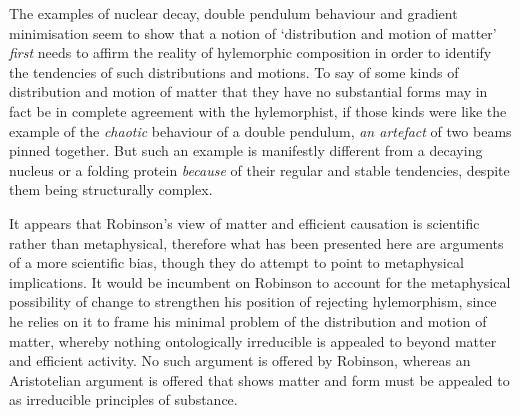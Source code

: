 The examples of nuclear decay, double pendulum behaviour and gradient minimisation seem to show that a notion of `distribution and motion of matter' \emph{first} needs to affirm the reality of hylemorphic composition in order to identify the tendencies of such distributions and motions. To say of some kinds of distribution and motion of matter that they have no substantial forms may in fact be in complete agreement with the hylemorphist, if those kinds were like the example of the \emph{chaotic} behaviour of a double pendulum, \emph{an artefact} of two beams pinned together. But such an example is manifestly different from a decaying nucleus or a folding protein \emph{because} of their regular and stable tendencies, despite them being structurally complex.

It appears that Robinson's view of matter and efficient causation is scientific rather than metaphysical, therefore what has been presented here are arguments of a more scientific bias, though they do attempt to point to metaphysical implications. It would be incumbent on Robinson to account for the metaphysical possibility of change to strengthen his position of rejecting hylemorphism, since he relies on it to frame his minimal problem of the distribution and motion of matter, whereby nothing ontologically irreducible is appealed to beyond matter and efficient activity. No such argument is offered by Robinson, whereas an Aristotelian argument is offered that shows matter and form must be appealed to as irreducible principles of substance.
